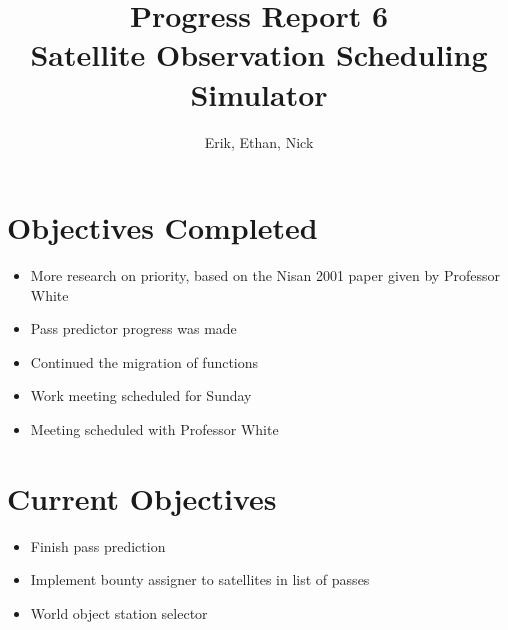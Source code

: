 \documentclass{article}
\title{Progress Report 6\\ Satellite Observation Scheduling Simulator}
\author{Erik, Ethan, Nick}
\begin{document}
\maketitle

\section{Objectives Completed}

\begin{itemize}
	\item More research on priority, based on the Nisan 2001 paper given by Professor White
	\item Pass predictor progress was made
	\item Continued the migration of functions
	\item Work meeting scheduled for Sunday
	\item Meeting scheduled with Professor White
\end{itemize}

\section{Current Objectives}

\begin{itemize}
  \item Finish pass prediction
  \item Implement bounty assigner to satellites in list of passes
  \item World object station selector
\end{itemize}
\end{document}
